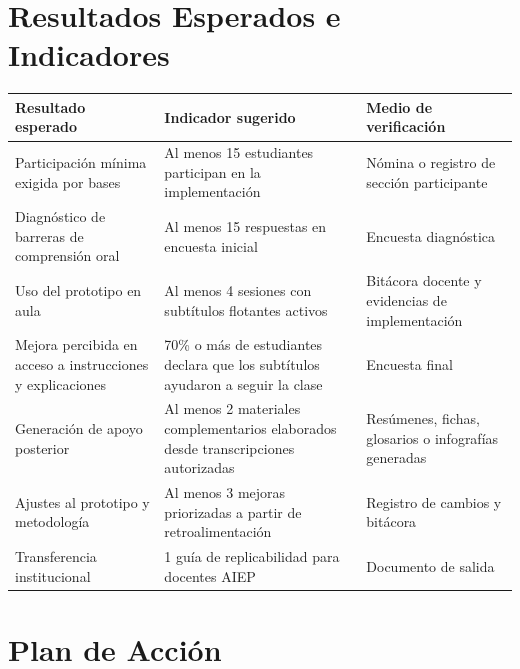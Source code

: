 \documentclass[11pt,letterpaper]{article}
\begin{document}
\section{Resultados Esperados e Indicadores}

\begin{longtable}{p{4.2cm}p{5.2cm}p{4.5cm}}
\toprule
\textbf{Resultado esperado} & \textbf{Indicador sugerido} & \textbf{Medio de verificación} \\
\midrule
Participación mínima exigida por bases & Al menos 15 estudiantes participan en la implementación & Nómina o registro de sección participante \\
Diagnóstico de barreras de comprensión oral & Al menos 15 respuestas en encuesta inicial & Encuesta diagnóstica \\
Uso del prototipo en aula & Al menos 4 sesiones con subtítulos flotantes activos & Bitácora docente y evidencias de implementación \\
Mejora percibida en acceso a instrucciones y explicaciones & 70\% o más de estudiantes declara que los subtítulos ayudaron a seguir la clase & Encuesta final \\
Generación de apoyo posterior & Al menos 2 materiales complementarios elaborados desde transcripciones autorizadas & Resúmenes, fichas, glosarios o infografías generadas \\
Ajustes al prototipo y metodología & Al menos 3 mejoras priorizadas a partir de retroalimentación & Registro de cambios y bitácora \\
Transferencia institucional & 1 guía de replicabilidad para docentes AIEP & Documento de salida \\
\bottomrule
\end{longtable}

\section{Plan de Acción}
\end{document}
